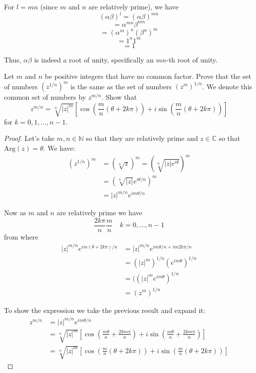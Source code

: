 \documentclass[
	12pt, %
	fleqn, %
	a4paper, %
]{LegrandOrangeBook}
\begin{document}
For \( l = mn \) (since \( m \) and \( n \) are relatively prime), we have
\[ (\alpha\beta)^l = (\alpha\beta)^{mn} \]
\[ = \alpha^{mn}\beta^{mn} \]
\[ = (\alpha^m)^n(\beta^n)^m \]
\[ = 1^n1^m \]
\[ = 1 \]

Thus, \( \alpha\beta \) is indeed a root of unity, specifically an \( mn \)-th root of unity.

\begin{exercise}
    Let \( m \) and \( n \) be positive integers that have no common factor. Prove that the set of numbers \( (z^{1/n})^m \) is the same as the set of numbers \( (z^m)^{1/n} \). We denote this common set of numbers by \( z^{m/n} \). Show that
\[ z^{m/n} = \sqrt[n]{|z|^m} \left[ \cos \left( \frac{m}{n} (\theta + 2k\pi) \right) + i \sin \left( \frac{m}{n} (\theta + 2k\pi) \right) \right] \]
for \( k = 0, 1, \ldots, n - 1 \).
\end{exercise}
\begin{proof}
    Let's take \( m, n \in \mathbb{N} \) so that they are relatively prime and \( z \in \mathbb{C} \) so that \( \text{Arg}(z) = \theta \). We have:
\begin{align*}
(z^{1/n})^m &= (\sqrt[n]{z})^m = \left( \sqrt[n]{|z|e^{i\theta}} \right)^m \\
&= \left( \sqrt[n]{|z|}e^{i\theta/n} \right)^m \\
&= |z|^{m/n} e^{im\theta/n}
\end{align*}

Now as \( m \) and \( n \) are relatively prime we have
\[ \frac{2k\pi}{n} \frac{m}{n} \quad k = 0, \ldots, n - 1 \]
from where
\begin{align*}
|z|^{m/n} e^{im(\theta + 2k\pi)/n} &= |z|^{m/n} e^{im\theta/n + im2k\pi/n} \\
&= (|z|^m)^{1/n} (e^{im\theta})^{1/n} \\
&= ((|z|^m e^{im\theta})^{1/n} \\
&= (z^m)^{1/n}
\end{align*}

To show the expression we take the previous result and expand it:
\begin{align*}
z^{m/n} &= |z|^{m/n} e^{im\theta/n} \\
&= \sqrt[n]{|z|^m} \left[ \cos \left( \frac{m\theta}{n} + \frac{2km\pi}{n} \right) + i \sin \left( \frac{m\theta}{n} + \frac{2km\pi}{n} \right) \right] \\
&= \sqrt[n]{|z|^m} \left[ \cos \left( \frac{m}{n} (\theta + 2k\pi) \right) + i \sin \left( \frac{m}{n} (\theta + 2k\pi) \right) \right]
\end{align*}
\end{proof}
\end{document}
